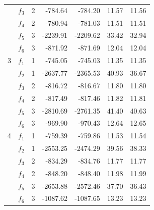 \documentclass[12pt]{article}
\begin{document}
\begin{table}[H]
\begin{tabular}{llrrrrr}
                & $f_3$ &        2 &   -784.64 &       -784.20 &     11.57 &         11.56 \\
                & $f_4$ &        2 &   -780.94 &       -781.03 &     11.51 &         11.51 \\
                & $f_5$ &        3 &  -2239.91 &      -2209.62 &     33.42 &         32.94 \\
                & $f_6$ &        3 &   -871.92 &       -871.69 &     12.04 &         12.04 \\
                \midrule
                3 & $f_1$ &        1 &   -745.05 &       -745.03 &     11.35 &         11.35 \\
                & $f_2$ &        1 &  -2637.77 &      -2365.53 &     40.93 &         36.67 \\
                & $f_3$ &        2 &   -816.72 &       -816.67 &     11.80 &         11.80 \\
                & $f_4$ &        2 &   -817.49 &       -817.46 &     11.82 &         11.81 \\
                & $f_5$ &        3 &  -2810.69 &      -2761.35 &     41.40 &         40.63 \\
                & $f_6$ &        3 &   -969.90 &       -970.43 &     12.64 &         12.65 \\
                \midrule
                4 & $f_1$ &        1 &   -759.39 &       -759.86 &     11.53 &         11.54 \\
                & $f_2$ &        1 &  -2553.25 &      -2474.29 &     39.56 &         38.33 \\
                & $f_3$ &        2 &   -834.29 &       -834.76 &     11.77 &         11.77 \\
                & $f_4$ &        2 &   -848.20 &       -848.40 &     11.98 &         11.99 \\
                & $f_5$ &        3 &  -2653.88 &      -2572.46 &     37.70 &         36.43 \\
                & $f_6$ &        3 &  -1087.62 &      -1087.65 &     13.23 &         13.23 \\
                \bottomrule
            \end{tabular}
        \end{table}

    \appendix
    
    
    
\end{document}
